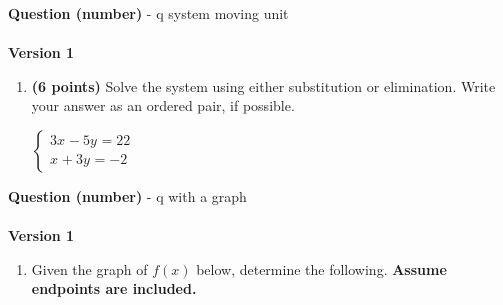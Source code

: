 \documentclass[12pt]{amsart}
\begin{document}
\begin{enumerate}[resume]
 \end{enumerate}\newpage\newpage\def \xis{4}\def \yis{-2}\def \nomatcho{[5,2,2,3]}\def \a{5}\def \c{-2}\def \b{-2}\def \d{3}\def \polyonesol{24}\def \polytwosol{-14}\def \xgoodone{5x^{}}\def \ygoodone{-2y^{}}\def \xgoodtwo{-2x^{}}\def \ygoodtwo{+3y^{}}\def \unitize{[0,0,1,0,0,1]}\def \mtem{3}\def \ntem{-5}\def \ptem{-4}\def \qtem{3}\def \m{3}\def \n{-5}\def \p{1}\def \q{3}\def \polytonesol{22}\def \polyttwosol{-2}\def \xtgoodone{3x^{}}\def \ytgoodone{-5y^{}}\def \xtgoodtwo{x^{}}\def \ytgoodtwo{+3y^{}}{\Large{\bf Question (number)}} - q system moving unit\\ $ $ \\ {\bf Version 1} \\\begin{enumerate}[resume]
\item {\bf (6 points)} 
 Solve the system using either substitution or elimination. Write your answer as an ordered pair, if possible. 

$ \begin{cases} \xtgoodone \ytgoodone = \polytonesol \\
\xtgoodtwo \ytgoodtwo = \polyttwosol
\end{cases}$

 \vfill \vfill
 \end{enumerate}\newpage\newpage\def \vshift{-1}\def \hshift{-4}\def \chang{-2}\def \findval{-6}\def \yval{3}{\Large{\bf Question (number)}} - q with a graph\\ $ $ \\ {\bf Version 1} \\\begin{enumerate}[resume]

 
\item Given the graph of $f(x)$ below, determine the following. {\bf Assume endpoints are included.}
\vspace{2mm}

\end{enumerate}
\end{document}
